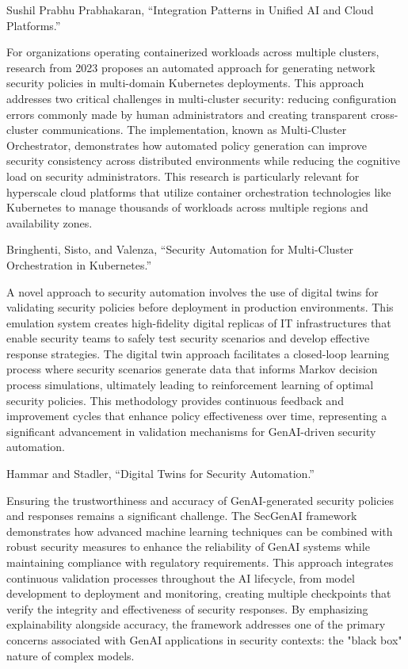 Sushil Prabhu Prabhakaran, “Integration Patterns in Unified AI and Cloud Platforms.”

For organizations operating containerized workloads across multiple clusters, research from 2023 proposes an automated approach for generating network security policies in multi-domain Kubernetes deployments. This approach addresses two critical challenges in multi-cluster security: reducing configuration errors commonly made by human administrators and creating transparent cross-cluster communications.
The implementation, known as Multi-Cluster Orchestrator, demonstrates how automated policy generation can improve security consistency across distributed environments while reducing the cognitive load on security administrators. This research is particularly relevant for hyperscale cloud platforms that utilize container orchestration technologies like Kubernetes to manage thousands of workloads across multiple regions and availability zones.

Bringhenti, Sisto, and Valenza, “Security Automation for Multi-Cluster Orchestration in Kubernetes.”

A novel approach to security automation involves the use of digital twins for validating security policies before deployment in production environments. This emulation system creates high-fidelity digital replicas of IT infrastructures that enable security teams to safely test security scenarios and develop effective response strategies.
The digital twin approach facilitates a closed-loop learning process where security scenarios generate data that informs Markov decision process simulations, ultimately leading to reinforcement learning of optimal security policies. This methodology provides continuous feedback and improvement cycles that enhance policy effectiveness over time, representing a significant advancement in validation mechanisms for GenAI-driven security automation.

Hammar and Stadler, “Digital Twins for Security Automation.”

Ensuring the trustworthiness and accuracy of GenAI-generated security policies and responses remains a significant challenge. The SecGenAI framework demonstrates how advanced machine learning techniques can be combined with robust security measures to enhance the reliability of GenAI systems while maintaining compliance with regulatory requirements.
This approach integrates continuous validation processes throughout the AI lifecycle, from model development to deployment and monitoring, creating multiple checkpoints that verify the integrity and effectiveness of security responses. By emphasizing explainability alongside accuracy, the framework addresses one of the primary concerns associated with GenAI applications in security contexts: the "black box" nature of complex models.

